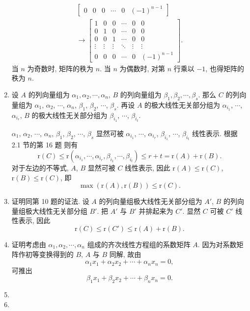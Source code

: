 \documentclass[a4paper, 11pt]{ctexart}
\newcommand{\rank}{\mathrm{r}}
\begin{document}
\begin{enumerate}
\begin{gather*}
\begin{bmatrix}
                0 & 0 & 0 & \cdots & 0 & (-1)^{n-1}   
            \end{bmatrix} \\
            \rightarrow
            \begin{bmatrix}
                1 & 0 & 0 & \cdots & 0 & 0 \\
                0 & 1 & 0 & \cdots & 0 & 0 \\
                0 & 0 & 1 & \cdots & 0 & 0 \\
                \vdots & \vdots & \vdots & \ddots & \vdots & \vdots \\
                0 & 0 & 0 & \cdots & 0 & (-1)^{n-1}   
            \end{bmatrix}.
        \end{gather*}
        当 $n$ 为奇数时, 矩阵的秩为 $n$. 当 $n$ 为偶数时, 对第 $n$ 行乘以 $-1$, 也得矩阵的秩为 $n$.
    \item %
        设 $A$ 的列向量组为 $\alpha_1, \alpha_2, \cdots, \alpha_n$, $B$ 的列向量组为 $\beta_1, \beta_2, \cdots, \beta_s$.
        那么 $C$ 的列向量组为 $\alpha_1$, $\alpha_2$, $\cdots$, $\alpha_n$, $\beta_1$, $\beta_2$, $\cdots$, $\beta_s$.
        再设 $A$ 的极大线性无关部分组为 $\alpha_{i_1}$, $\cdots$, $\alpha_{i_r}$, $B$ 的极大线性无关部分组为 $\beta_{i_1}$, $\cdots$, $\beta_{i_t}$.
        
        $\alpha_1$, $\alpha_2$, $\cdots$, $\alpha_n$, $\beta_1$, $\beta_2$, $\cdots$, $\beta_s$ 显然可被 $\alpha_{i_1}$, $\cdots$, $\alpha_{i_r}$, $\beta_{i_1}$, $\cdots$, $\beta_{i_t}$ 线性表示.
        根据 2.1 节的第 16 题 则有
        \[
            \rank(C) \leqslant \rank(\alpha_{i_1}, \cdots, \alpha_{i_r}, \beta_{i_1}, \cdots, \beta_{i_t}) \leqslant r + t = \rank(A) + \rank(B).    
        \]
        对于左边的不等式, $A$, $B$ 显然可被 $C$ 线性表示, 因此 $\rank(A) \leqslant \rank(C)$, $\rank(B) \leqslant \rank(C)$, 即
        \[
            \max(\rank(A), \rank(B)) \leqslant \rank(C).    
        \]
    \item %
        {\heiti 证明}\quad 同第 10 题的证法. 设 $A$ 的列向量组极大线性无关部分组为 $A'$, $B$ 的列向量组极大线性无关部分组 $B'$.
        把 $A'$ 与 $B'$ 并排起来为 $C'$. 显然 $C$ 可被 $C'$ 线性表示, 因此
        \[
            \rank(C) \leqslant \rank(C') \leqslant \rank(A) + \rank(B).    
        \]
    \item %
        {\heiti 证明}\quad 考虑由 $\alpha_1, \alpha_2, \cdots, \alpha_n$ 组成的齐次线性方程组的系数矩阵 $A$.
        因为对系数矩阵作初等变换得到的 $B$, $A$ 与 $B$ 同解, 故由
        \[
            \alpha_1x_1 + \alpha_2x_2 + \cdots + \alpha_nx_n = 0,    
        \]
        可推出
        \[
            \beta_1x_1 + \beta_2x_2 + \cdots + \beta_nx_n = 0.    
        \]
    \item %
    \item %
\end{enumerate}
\end{document}

